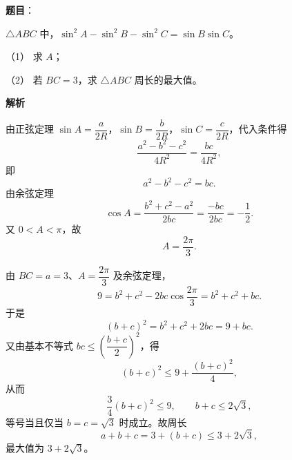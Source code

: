 \begin{answer}

\textbf{题目}：

$\triangle ABC$ 中，$\sin^2A-\sin^2B-\sin^2C=\sin B\sin C$。

（1） 求 $A$；

（2） 若 $BC=3$，求 $\triangle ABC$ 周长的最大值。

\textbf{解析}


由正弦定理 $\sin A=\dfrac{a}{2R}$，$\sin B=\dfrac{b}{2R}$，$\sin C=\dfrac{c}{2R}$，代入条件得
\nopagebreak[4]
\[\frac{a^2-b^2-c^2}{4R^2}=\frac{bc}{4R^2},\]
即
\nopagebreak[4]
\[a^2-b^2-c^2=bc .\]
由余弦定理
\nopagebreak[4]
\[\cos A=\frac{b^2+c^2-a^2}{2bc}=\frac{-bc}{2bc}=-\frac12 .\]
又 $0<A<\pi$，故
\nopagebreak[4]
\[A=\frac{2\pi}3 .\]


由 $BC=a=3$、$A=\dfrac{2\pi}3$ 及余弦定理，
\nopagebreak[4]
\[9=b^2+c^2-2bc\cos\frac{2\pi}3=b^2+c^2+bc .\]
于是
\nopagebreak[4]
\[(b+c)^2=b^2+c^2+2bc=9+bc .\]
又由基本不等式 $bc\leqslant\left(\dfrac{b+c}2\right)^2$，得
\nopagebreak[4]
\[(b+c)^2\leqslant9+\frac{(b+c)^2}4,\]
从而
\nopagebreak[4]
\[\frac34(b+c)^2\leqslant9,\qquad b+c\leqslant2\sqrt3,\]
等号当且仅当 $b=c=\sqrt3$ 时成立。故周长
\nopagebreak[4]
\[a+b+c=3+(b+c)\leqslant3+2\sqrt3,\]
最大值为 $3+2\sqrt3$。



\end{answer}
